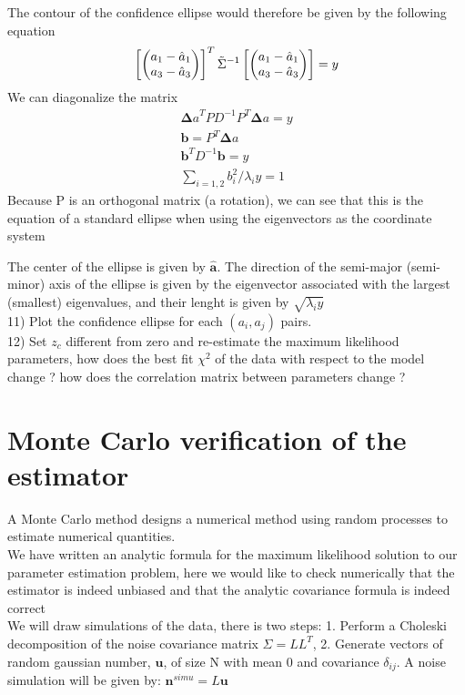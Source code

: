 \documentclass[a4paper]{article}
\def\ba{\begin{eqnarray}}
\def\ea{\end{eqnarray}}
\begin{document}
The contour of the confidence ellipse would therefore be given by the following equation
\ba
 \left[  \begin{pmatrix} 
a_{1} - \hat{a}_{1} \cr
a_{3} - \hat{a}_{3} \cr
\end{pmatrix}
 \right]^{T} \tilde{\Sigma}^{-1}  \left[  \begin{pmatrix} 
a_{1} - \hat{a}_{1} \cr
a_{3} - \hat{a}_{3} \cr
\end{pmatrix} \right]    = y
\ea
We can diagonalize the matrix
\ba
{\bm \Delta a}^{T} P D^{-1} P^{T} {\bm  \Delta a}    = y \\
{\bm b} = P^{T}  {\bm  \Delta a} \\
{\bm b}^{T} D^{-1} {\bm  b} = y \\
\sum_{i=1,2} b^{2}_{i}/ \lambda_{i}y = 1
\ea
Because   P is an orthogonal matrix (a rotation), we can see that this is the equation of a standard ellipse when using the eigenvectors as the coordinate system

The center of the ellipse is given by $\bm{\hat{a}}$.
The direction of the semi-major (semi-minor) axis of the ellipse is given by the  eigenvector associated with the largest (smallest) eigenvalues, and their lenght is given by $\sqrt{\lambda_{i}y}$ \\

11) Plot the confidence ellipse for each $(a_{i}, a_{j})$ pairs. \\

12) Set $z_{c}$ different from zero and re-estimate the maximum likelihood parameters, how does the best fit $\chi^{2}$ of the data with respect to the model change ? how does the correlation matrix between parameters change ?
 




\section{Monte Carlo verification of the estimator}

A Monte Carlo method designs a numerical method using random processes to estimate numerical quantities. \\

We have written an analytic formula for the maximum likelihood solution to our parameter estimation problem, here we would like to check numerically that the estimator is indeed unbiased and that the analytic covariance formula is indeed correct \\
We will draw simulations of the data,  there is two steps: 1.  Perform a Choleski decomposition of the noise covariance matrix $\Sigma = LL^{T}$, 2. Generate vectors of random gaussian  number, ${\bm u}$, of size N with mean 0 and covariance $\delta_{ij}$. 
A noise simulation will be given by: ${\bm n}^{simu}= L {\bm u} $ \\
\end{document}
